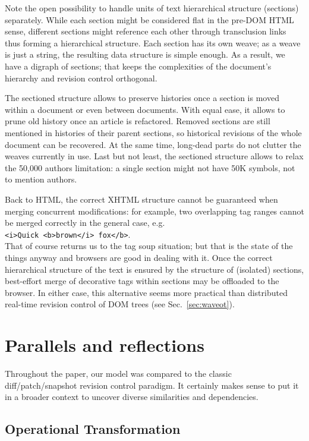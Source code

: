 \documentclass{acm_proc_article-sp}
\begin{document}
Note the open possibility to handle units of text hierarchical
structure (sections) separately. While each section might
be considered flat in the pre-DOM HTML sense, different sections
might reference each other through transclusion links thus
forming a hierarchical structure. Each section has its own weave;
as a weave is just a string, the resulting data structure is
simple enough.
As a result, we have a digraph of sections;  
that keeps the complexities of the document's hierarchy and
revision control orthogonal. 

The sectioned structure allows to preserve histories once a
section is moved within a document or even between documents.
With equal ease, it allows to prune old history once an
article is refactored. Removed sections are still
mentioned in histories of their parent sections, so historical
revisions of the whole document can be recovered. At the
same time, long-dead parts do not clutter the weaves currently
in use. Last but not least, the sectioned structure allows
to relax the 50,000 authors limitation: a single section
might not have 50K symbols, not to mention authors.

Back to HTML, the correct XHTML structure cannot
be guaranteed when merging concurrent modifications: for example,
two overlapping tag ranges cannot be merged correctly in the
general case, e.g. \\ \verb+<i>Quick <b>brown</i> fox</b>+. \\
That of course returns us to the tag soup situation; but that is
the state of the things anyway and  browsers are good in dealing
with it. 
Once the correct hierarchical structure of the text is ensured by
the structure of (isolated) sections, best-effort merge of decorative
tags within sections may be offloaded to the browser.
In either case, this alternative seems more practical
than distributed real-time revision control of DOM trees
(see Sec.~\ref{sec:waveot}).


\section{Parallels and reflections} \label{sec:reflections}

Throughout the paper, our model was compared to the classic
diff/patch/snapshot revision control paradigm. It certainly makes
sense to put it in a broader context to uncover diverse
similarities and dependencies.

\subsection{Operational Transformation}
\end{document}
